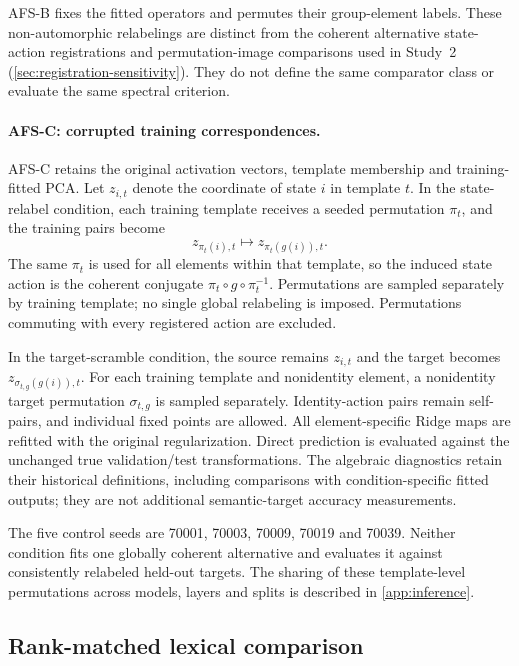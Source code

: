 AFS-B fixes the fitted operators and permutes their
group-element labels.
These non-automorphic relabelings are distinct from the
coherent alternative state-action registrations and
permutation-image comparisons used in Study~2
(\cref{sec:registration-sensitivity}).
They do not define the same comparator class or evaluate
the same spectral criterion.

\paragraph{AFS-C: corrupted training correspondences.}
AFS-C retains the original activation vectors,
template membership and training-fitted PCA.
Let $z_{i,t}$ denote the coordinate of state $i$ in template $t$.
In the state-relabel condition, each training template receives
a seeded permutation $\pi_t$, and the training pairs become
\[
 z_{\pi_t(i),t}
 \longmapsto
 z_{\pi_t(g(i)),t}.
\]
The same $\pi_t$ is used for all elements within that template,
so the induced state action is the coherent conjugate
$\pi_t\circ g\circ\pi_t^{-1}$.
Permutations are sampled separately by training template;
no single global relabeling is imposed.
Permutations commuting with every registered action are excluded.

In the target-scramble condition, the source remains $z_{i,t}$
and the target becomes $z_{\sigma_{t,g}(g(i)),t}$.
For each training template and nonidentity element,
a nonidentity target permutation $\sigma_{t,g}$ is sampled
separately.
Identity-action pairs remain self-pairs, and individual
fixed points are allowed.
All element-specific Ridge maps are refitted with the
original regularization.
Direct prediction is evaluated against the unchanged true
validation/test transformations.
The algebraic diagnostics retain their historical definitions,
including comparisons with condition-specific fitted outputs;
they are not additional semantic-target accuracy measurements.

The five control seeds are 70001, 70003, 70009, 70019 and 70039.
Neither condition fits one globally coherent alternative
and evaluates it against consistently relabeled held-out targets.
The sharing of these template-level permutations across
models, layers and splits is described in \cref{app:inference}.

\subsection{Rank-matched lexical comparison}
\label{app:lexical-rank}

